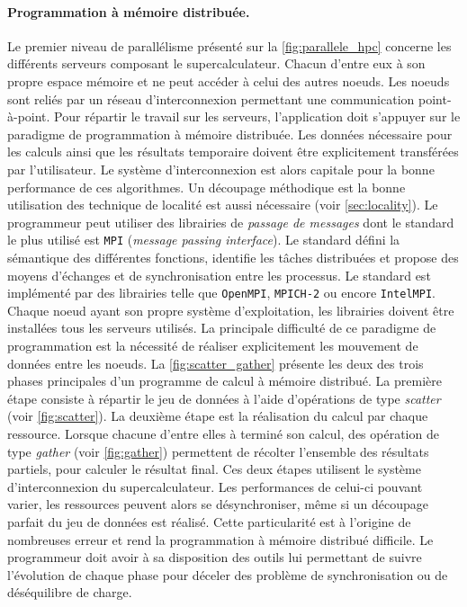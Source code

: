             \paragraph{Programmation à mémoire distribuée.} Le premier niveau de parallélisme présenté sur la \autoref{fig:parallele_hpc} concerne les différents serveurs composant le supercalculateur. Chacun d'entre eux à son propre espace mémoire et ne peut accéder à celui des autres noeuds. Les noeuds sont reliés par un réseau d'interconnexion permettant une communication point-à-point. Pour répartir le travail sur les serveurs, l'application doit s'appuyer sur le paradigme de programmation à mémoire distribuée. Les données nécessaire pour les calculs ainsi que les résultats temporaire doivent être explicitement transférées par l'utilisateur. Le système d'interconnexion est alors capitale pour la bonne performance de ces algorithmes. Un découpage méthodique est la bonne utilisation des technique de localité est aussi nécessaire (voir \autoref{sec:locality}). 
            Le programmeur peut utiliser des librairies de \textit{passage de messages} dont le standard le plus utilisé est \verb|MPI| (\textit{message passing interface}). Le standard défini la sémantique des différentes fonctions, identifie les tâches distribuées et propose des moyens d'échanges et de synchronisation entre les processus. Le standard est implémenté par des librairies telle que \verb|OpenMPI|, \verb|MPICH-2| ou encore \verb|IntelMPI|. Chaque noeud ayant son propre système d'exploitation, les librairies doivent être installées tous les serveurs utilisés.
            La principale difficulté de ce paradigme de programmation est la nécessité de réaliser explicitement les mouvement de données entre les noeuds. La \autoref{fig:scatter_gather} présente les deux des trois phases principales d'un programme de calcul à mémoire distribué. La première étape consiste à répartir le jeu de données à l'aide d'opérations de type \textit{scatter} (voir \autoref{fig:scatter}). La deuxième étape est la réalisation du calcul par chaque ressource. Lorsque chacune d'entre elles à terminé son calcul, des opération de type \textit{gather} (voir \autoref{fig:gather}) permettent de récolter l'ensemble des résultats partiels, pour calculer le résultat final. Ces deux étapes utilisent le système d'interconnexion du supercalculateur. Les performances de celui-ci pouvant varier, les ressources peuvent alors se désynchroniser, même si un découpage parfait du jeu de données est réalisé. Cette particularité est à l'origine de nombreuses erreur et rend la programmation à mémoire distribué difficile. Le programmeur doit avoir à sa disposition des outils lui permettant de suivre l'évolution de chaque phase pour déceler des problème de synchronisation ou de déséquilibre de charge.
            
